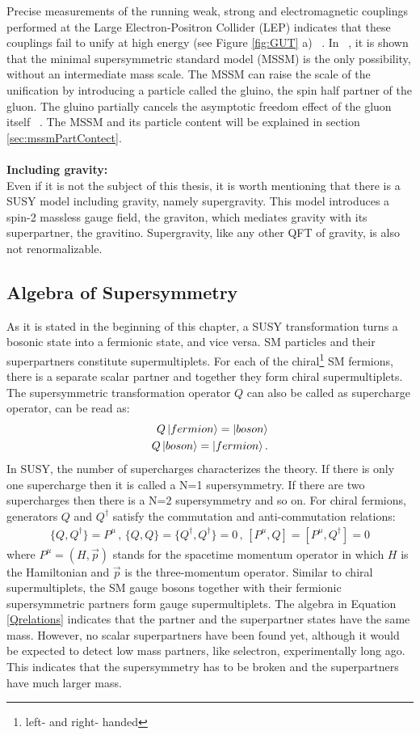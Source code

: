 Precise measurements of the running weak, strong and electromagnetic couplings performed at the Large Electron-Positron Collider (LEP) indicates that these couplings fail to unify at high energy (see Figure \ref{fig:GUT} a) ~\cite{ALEPH,GUTLep}. In ~\cite{GUTLep}, it is shown that the minimal supersymmetric standard model (MSSM) is the only possibility, without an intermediate mass scale. The MSSM can raise the scale of the unification by introducing a particle called the gluino, the spin half partner of the gluon. The gluino partially cancels the asymptotic freedom effect of the gluon itself ~\cite{Wil}.
The MSSM and its particle content will be explained in section \ref{sec:mssmPartContect}.
\\
\\
\textbf{Including gravity:}
\\
Even if it is not the subject of this thesis, it is worth mentioning that there is a SUSY model including gravity, namely supergravity. This model introduces a spin-2 massless gauge field, the graviton, which mediates gravity with its superpartner, the gravitino.  Supergravity, like any other QFT of gravity, is also not renormalizable.
\subsection{Algebra of Supersymmetry}
As it is stated in the beginning of this chapter, a SUSY transformation turns a bosonic state into a fermionic state, and vice versa. SM particles and their superpartners constitute supermultiplets.  For each of the chiral\footnote{left- and right- handed} SM fermions, there is a separate scalar partner and together they form chiral supermultiplets. The supersymmetric transformation operator $Q$ can also be called as supercharge operator, can be read as:
\begin{eqnarray}
\label{Q}
Q\ket{fermion} = \ket{boson} \\
Q\ket{boson} = \ket{fermion}.
\end{eqnarray}
In SUSY, the number of supercharges characterizes the theory. If there is only one supercharge then it is called a N=1 supersymmetry.  If there are two supercharges then there is a N=2 supersymmetry and so on. 
For chiral fermions, generators $Q$ and $Q^{\dagger}$ satisfy the commutation and anti-commutation relations:
\begin{eqnarray}
\label{Qrelations}
{\{Q,Q^{\dagger}\}=P^{\mu} \, , \, \{Q,Q\}=\{Q^{\dagger},Q^{\dagger}\}=0 \,,\, [P^{\mu},Q]=[P^{\mu},Q^{\dagger}]=0}
\end{eqnarray}
where $P^{\mu}=(H,\overrightarrow{p})$ stands for the spacetime momentum operator in which $H$ is the Hamiltonian and $\overrightarrow{p}$ is the three-momentum operator. 
Similar to chiral supermultiplets, the SM gauge bosons together with their fermionic supersymmetric partners form gauge supermultiplets.
The algebra in Equation \ref{Qrelations} indicates that the partner and the superpartner states have the same mass. However, no scalar superpartners have been found yet, although it would be expected to detect low mass partners, like selectron, experimentally long ago. This indicates that the supersymmetry has to be broken and the superpartners have much larger mass.
